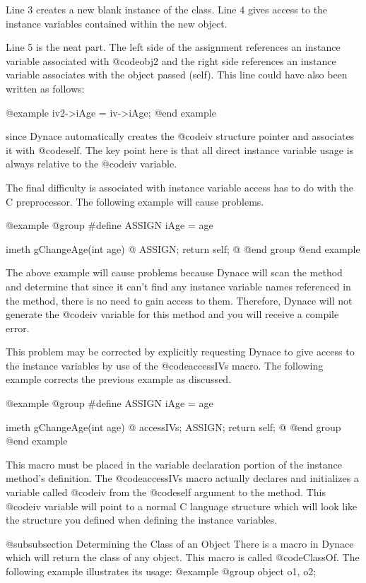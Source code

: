 Line 3 creates a new blank instance of the class.  Line 4 gives access
to the instance variables contained within the new object.

Line 5 is the neat part.  The left side of the assignment references
an instance variable associated with @code{obj2} and the right side
references an instance variable associates with the object passed
(self).  This line could have also been written as follows:

@example
        iv2->iAge = iv->iAge;
@end example

since Dynace automatically creates the @code{iv} structure pointer and
associates it with @code{self}.  The key point here is that
all direct instance variable usage is always relative to the @code{iv}
variable.

The final difficulty is associated with instance variable access has to do
with the C preprocessor.  The following example will cause problems.

@example
@group
#define ASSIGN  iAge = age

imeth   gChangeAge(int age)
@{
        ASSIGN;
        return self;
@}
@end group
@end example

The above example will cause problems because Dynace will scan the
method and determine that since it can't find any instance variable
names referenced in the method, there is no need to gain access to them.
Therefore, Dynace will not generate the @code{iv} variable for this
method and you will receive a compile error.

This problem may be corrected by explicitly requesting Dynace to give
access to the instance variables by use of the @code{accessIVs} macro.
The following example corrects the previous example as discussed.

@example
@group
#define ASSIGN  iAge = age

imeth   gChangeAge(int age)
@{
        accessIVs;
        ASSIGN;
        return self;
@}
@end group
@end example

This macro must be placed in the variable declaration portion of the
instance method's definition.  The @code{accessIVs} macro actually declares
and initializes a variable called @code{iv} from the @code{self} argument
to the method.  This @code{iv} variable will point to a normal C language
structure which will look like the structure you defined when defining
the instance variables.



@subsubsection Determining the Class of an Object
There is a macro in Dynace which will return the class of any object.  This
macro is called @code{ClassOf}.  The following example illustrates its usage:
@example
@group
        object  o1, o2;

